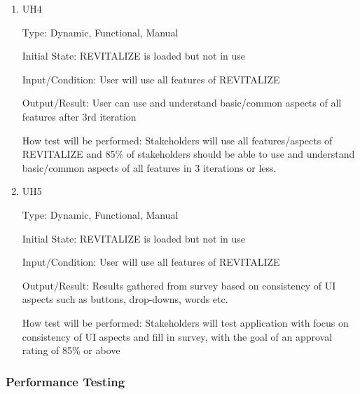 \documentclass[12pt, titlepage]{article}
\begin{document}
\begin{enumerate}
\item{UH4\\}

Type: Dynamic, Functional, Manual
					
Initial State: REVITALIZE is loaded but not in use
					
Input/Condition: User will use all features of REVITALIZE
					
Output/Result: User can use and understand basic/common aspects of all features after 3rd iteration
					
How test will be performed: Stakeholders will use all features/aspects of REVITALIZE and 85\% of stakeholders should be able to use and understand basic/common aspects of all features in 3 iterations or less.

\item{UH5\\}

Type: Dynamic, Functional, Manual
					
Initial State: REVITALIZE is loaded but not in use
					
Input/Condition: User will use all features of REVITALIZE
					
Output/Result: Results gathered from survey based on consistency of UI aspects such as buttons, drop-downs, words etc.
					
How test will be performed: Stakeholders will test application with focus on consistency of UI aspects and fill in survey, with the goal of an approval rating of 85\% or above

\end{enumerate}

\subsubsection{Performance Testing}
\end{document}
